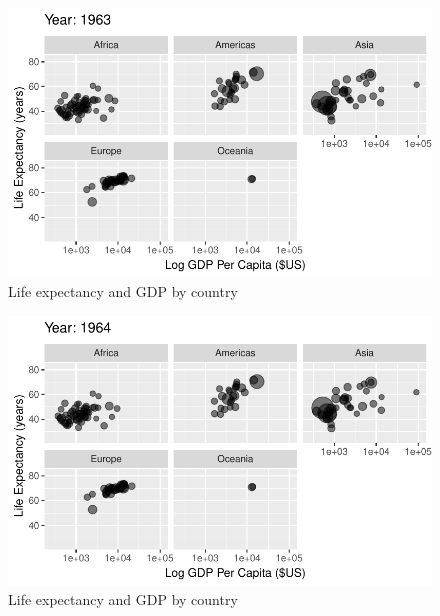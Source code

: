 \documentclass[
  letterpaper,
  DIV=11,
  numbers=noendperiod]{scrreport}
\theoremstyle{definition}
\theoremstyle{remark}
\begin{document}
\begin{figure}

{\centering \includegraphics{index_files/figure-pdf/fig-anim-lifegdp-21.pdf}

}

\caption{\label{fig-anim-lifegdp-21}Life expectancy and GDP by country}

\end{figure}

\begin{figure}

{\centering \includegraphics{index_files/figure-pdf/fig-anim-lifegdp-22.pdf}

}

\caption{\label{fig-anim-lifegdp-22}Life expectancy and GDP by country}

\end{figure}
\end{document}

